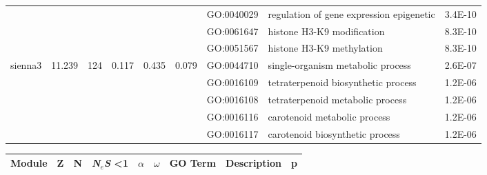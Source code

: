 \begin{landscape}
\begin{table}[ht]
\begin{tabular}{lrrrrrlP{5cm}r}
   &  &  &  &  &  & GO:0040029 & regulation of gene expression epigenetic & 3.4E-10 \\ 
   &  &  &  &  &  & GO:0061647 & histone H3-K9 modification & 8.3E-10 \\ 
   &  &  &  &  &  & GO:0051567 & histone H3-K9 methylation & 8.3E-10 \\ 
\hline  
sienna3 & 11.239 & 124 & 0.117 & 0.435 & 0.079 & GO:0044710 & single-organism metabolic process & 2.6E-07 \\ 
   &  &  &  &  &  & GO:0016109 & tetraterpenoid biosynthetic process & 1.2E-06 \\ 
   &  &  &  &  &  & GO:0016108 & tetraterpenoid metabolic process & 1.2E-06 \\ 
   &  &  &  &  &  & GO:0016116 & carotenoid metabolic process & 1.2E-06 \\ 
   &  &  &  &  &  & GO:0016117 & carotenoid biosynthetic process & 1.2E-06 \\ 
\hline  

\end{tabular}
\end{table}


\begin{table}[ht]
\centering
\begin{tabular}{lrrrrrlP{5cm}r}
  \hline
Module & Z & N & \textit{N$_{e}$S} \textless 1& $\alpha$ & $\omega$ & GO Term & Description & p \\ 
  \hline


\end{tabular}
\end{table}
\end{landscape}
